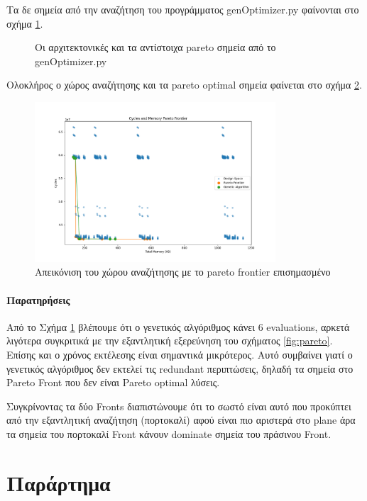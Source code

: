 \documentclass{article}
\newcommand{\eng}[1]{\foreignlanguage{english}{#1}} %
\begin{document}
Τα δε σημεία από την αναζήτηση του προγράμματος \eng{genOptimizer.py} φαίνονται
στο σχήμα \ref{fig:pareto-genOptimizer}.

\begin{figure}[h]
    
    \caption{Οι αρχιτεκτονικές και τα αντίστοιχα \eng{pareto} σημεία από το \eng{genOptimizer.py}}
    \label{fig:pareto-genOptimizer}
\end{figure}
\FloatBarrier

Ολοκλήρος ο χώρος αναζήτησης και τα \eng{pareto optimal} σημεία 
φαίνεται στο σχήμα \ref{fig:pareto-space}.

\begin{figure}[h]
    \centering
    \includegraphics[width=0.8\textwidth]{./plots/pareto.png}
    \caption{Απεικόνιση του χώρου αναζήτησης με το \eng{pareto frontier} επισημασμένο}
    \label{fig:pareto-space}
\end{figure}
\FloatBarrier

\subsection*{Παρατηρήσεις}

Από το Σχήμα \ref{fig:pareto-genOptimizer} βλέπουμε ότι ο γενετικός αλγόριθμος κάνει 6 evaluations, αρκετά λιγότερα συγκριτικά με την εξαντλητική εξερεύνηση του σχήματος \ref{fig:pareto}. Επίσης και ο χρόνος εκτέλεσης είναι σημαντικά μικρότερος. Αυτό συμβαίνει γιατί ο γενετικός αλγόριθμος δεν εκτελεί τις \eng{redundant} περιπτώσεις, δηλαδή τα σημεία στο \eng{Pareto Front} που δεν είναι \eng{Pareto optimal} λύσεις.

Συγκρίνοντας τα δύο \eng{Fronts} διαπιστώνουμε ότι το σωστό είναι αυτό που προκύπτει από την εξαντλητική αναζήτηση (πορτοκαλί) αφού είναι πιο αριστερά στο \eng{plane} άρα τα σημεία του πορτοκαλί \eng{Front} κάνουν \eng{dominate} σημεία του πράσινου \eng{Front}.

\clearpage
\part{Παράρτημα}



\clearpage

\clearpage

\end{document}
